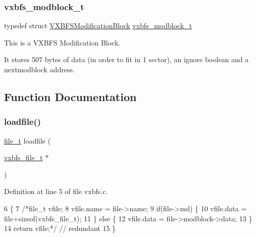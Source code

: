 \subsubsection{\texorpdfstring{vxbfs\+\_\+modblock\+\_\+t}{vxbfs\_modblock\_t}}
{\footnotesize\ttfamily typedef struct \hyperlink{a00332}{V\+X\+B\+F\+S\+Modification\+Block}  \hyperlink{a00206_a0774a42f7a124b6d3054ccabd4d35463_a0774a42f7a124b6d3054ccabd4d35463}{vxbfs\+\_\+modblock\+\_\+t}}



This is a V\+X\+B\+FS Modification Block. 

It stores 507 bytes of data (in order to fit in 1 sector), an ignore boolean and a nextmodblock address. 

\subsection{Function Documentation}
\mbox{\label{a00206_a056a7e9a594275f19bd99150a92f266a_a056a7e9a594275f19bd99150a92f266a}} 
\subsubsection{\texorpdfstring{loadfile()}{loadfile()}}
{\footnotesize\ttfamily \hyperlink{a00191_aa5445a6474a23ee3e7756d432dfa4ba1_aa5445a6474a23ee3e7756d432dfa4ba1}{file\+\_\+t} loadfile (\begin{DoxyParamCaption}\item[{\hyperlink{a00206_abb93e2407af0d8fe0f5629ce6456c6f9_abb93e2407af0d8fe0f5629ce6456c6f9}{vxbfs\+\_\+file\+\_\+t} $\ast$}]{ }\end{DoxyParamCaption})}



Definition at line 5 of file vxbfs.\+c.


\begin{DoxyCode}
6 \{
7     \textcolor{comment}{/*file\_t vfile;}
8 \textcolor{comment}{    vfile.name = file->name;}
9 \textcolor{comment}{    if(file->md) \{}
10 \textcolor{comment}{        vfile.data = file+sizeof(vxbfs\_file\_t);}
11 \textcolor{comment}{    \} else \{}
12 \textcolor{comment}{        vfile.data = file->modblock->data;}
13 \textcolor{comment}{    \}}
14 \textcolor{comment}{    return vfile;*/} \textcolor{comment}{// redundant}
15 \}
\end{DoxyCode}
\mbox{\label{a00206_a092e5bdd19e8369aa33901fffeb1f025_a092e5bdd19e8369aa33901fffeb1f025}} 

